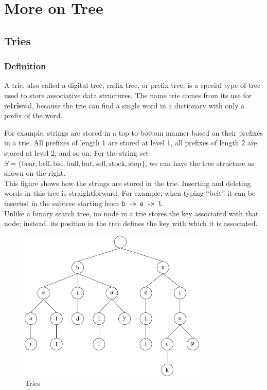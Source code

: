 \chapter{More on Tree}

\section{Tries}
\subsection{Definition}
A trie, also called a digital tree, radix tree, or prefix tree, is a special type of tree used to store associative data structures. The name trie comes from its use for re\textbf{trie}val, because the trie can find a single word in a dictionary with only a prefix of the word. 

\begin{minipage}{0.5\textwidth}
For example, strings are stored in a top-to-bottom manner based on their prefixes in a trie. All prefixes of length 1 are stored at level 1, all prefixes of length 2 are stored at level 2, and so on. For the string set \( S = \{ \text{bear}, \text{bell}, \text{bid}, \text{bull}, \text{but}, \text{sell}, \text{stock}, \text{stop} \} \), we can have the tree structure as shown on the right. \\[5pt]
This figure shows how the strings are stored in the trie. Inserting and deleting words in this tree is straightforward. For example, when typing ``belt'' it can be inserted in the subtree starting from \verb|b -> e -> l|. \\[5pt]
Unlike a binary search tree, no node in a trie stores the key associated with that node; instead, its position in the tree defines the key with which it is associated.
\end{minipage}
\begin{minipage}{0.5\textwidth}
\begin{figure}[H]
  \centering
  \includegraphics[width=0.8\textwidth]{Figure/Tries.pdf}
  \caption{Tries}
\end{figure}
\end{minipage}

